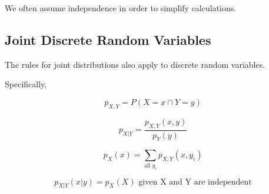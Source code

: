 We often assume independence in order to simplify calculations.

\subsection*{Joint Discrete Random Variables}
The rules for joint distributions also apply to discrete random variables. 

Specifically,

\[
  p_{X, Y} = P(X = x \cap Y = y)
\]

\[
    p_{X|Y} = \frac{p_{X,Y}(x, y)}{p_Y(y)}
\]

\[
    p_X(x) = \sum_{\text{all } y_i} p_{X, Y}(x, y_i)
\]

\[
    p_{X|Y}(x|y) = p_X(X) \text{ given X and Y are independent}
\]